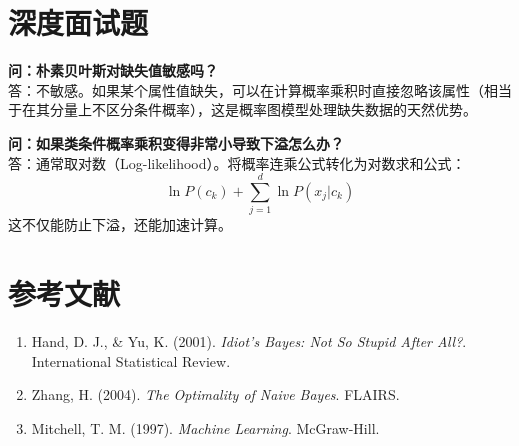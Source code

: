 \documentclass[12pt, a4paper]{article}
\begin{document}
\section{深度面试题}

\textbf{问：朴素贝叶斯对缺失值敏感吗？}\\
答：不敏感。如果某个属性值缺失，可以在计算概率乘积时直接忽略该属性（相当于在其分量上不区分条件概率），这是概率图模型处理缺失数据的天然优势。

\textbf{问：如果类条件概率乘积变得非常小导致下溢怎么办？}\\
答：通常取对数（Log-likelihood）。将概率连乘公式转化为对数求和公式：
$$ \ln P(c_k) + \sum_{j=1}^d \ln P(x_j|c_k) $$
这不仅能防止下溢，还能加速计算。

\section{参考文献}
\begin{enumerate}
    \item Hand, D. J., \& Yu, K. (2001). \textit{Idiot's Bayes: Not So Stupid After All?}. International Statistical Review.
    \item Zhang, H. (2004). \textit{The Optimality of Naive Bayes}. FLAIRS.
    \item Mitchell, T. M. (1997). \textit{Machine Learning}. McGraw-Hill.
\end{enumerate}
\end{document}

